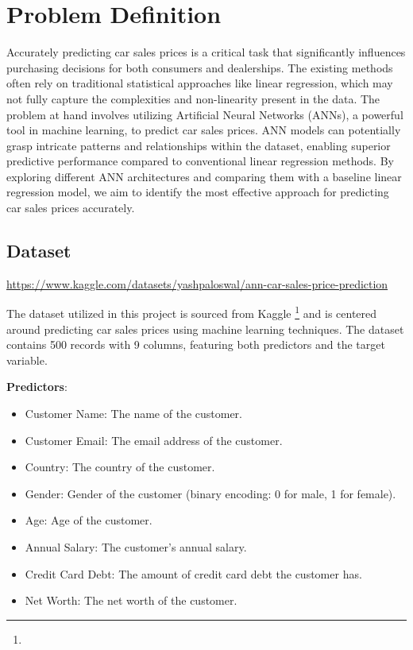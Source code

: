 \documentclass[manuscript,screen,review,nonacm]{acmart}
\begin{document}
\section{Problem Definition}
Accurately predicting car sales prices is a critical task that significantly influences purchasing decisions for both consumers and dealerships. The existing methods often rely on traditional statistical approaches like linear regression, which may not fully capture the complexities and non-linearity present in the data. The problem at hand involves utilizing Artificial Neural Networks (ANNs), a powerful tool in machine learning, to predict car sales prices. ANN models can potentially grasp intricate patterns and relationships within the dataset, enabling superior predictive performance compared to conventional linear regression methods. By exploring different ANN architectures and comparing them with a baseline linear regression model, we aim to identify the most effective approach for predicting car sales prices accurately.

\subsection{Dataset}
\urldef{\dataurl}\url{https://www.kaggle.com/datasets/yashpaloswal/ann-car-sales-price-prediction}


The dataset utilized in this project is sourced from Kaggle \footnote{\dataurl} and is centered around predicting car sales prices using machine learning techniques. The dataset contains 500 records with 9 columns, featuring both predictors and the target variable. 


\textbf{Predictors}:
\begin{itemize}
    \item Customer Name: The name of the customer.
    \item Customer Email: The email address of the customer.
    \item Country: The country of the customer.
    \item Gender: Gender of the customer (binary encoding: 0 for male, 1 for female).
    \item Age: Age of the customer.
    \item Annual Salary: The customer's annual salary.
    \item Credit Card Debt: The amount of credit card debt the customer has.
    \item Net Worth: The net worth of the customer.
\end{itemize}
\end{document}
